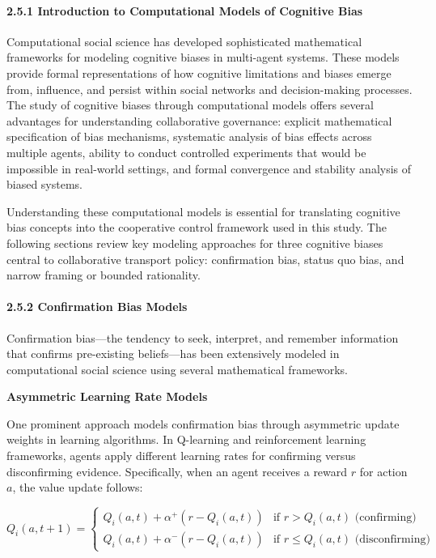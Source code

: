\paragraph{2.5.1 Introduction to Computational Models of Cognitive
Bias}\label{introduction-to-computational-models-of-cognitive-bias}

Computational social science has developed sophisticated mathematical
frameworks for modeling cognitive biases in multi-agent systems. These
models provide formal representations of how cognitive limitations and
biases emerge from, influence, and persist within social networks and
decision-making processes. The study of cognitive biases through
computational models offers several advantages for understanding
collaborative governance: explicit mathematical specification of bias
mechanisms, systematic analysis of bias effects across multiple agents,
ability to conduct controlled experiments that would be impossible in
real-world settings, and formal convergence and stability analysis of
biased systems.

Understanding these computational models is essential for translating
cognitive bias concepts into the cooperative control framework used in
this study. The following sections review key modeling approaches for
three cognitive biases central to collaborative transport policy:
confirmation bias, status quo bias, and narrow framing or bounded
rationality.

\paragraph{2.5.2 Confirmation Bias
Models}\label{confirmation-bias-models}

Confirmation bias---the tendency to seek, interpret, and remember
information that confirms pre-existing beliefs---has been extensively
modeled in computational social science using several mathematical
frameworks.

\textbf{Asymmetric Learning Rate Models}

One prominent approach models confirmation bias through asymmetric
update weights in learning algorithms. In Q-learning and reinforcement
learning frameworks, agents apply different learning rates for
confirming versus disconfirming evidence. Specifically, when an agent
receives a reward \(r\) for action \(a\), the value update follows:

\[Q_i(a,t+1) = \begin{cases}
Q_i(a,t) + \alpha^+(r - Q_i(a,t)) & \text{if } r > Q_i(a,t) \text{ (confirming)} \\
Q_i(a,t) + \alpha^-(r - Q_i(a,t)) & \text{if } r \leq Q_i(a,t) \text{ (disconfirming)}
\end{cases}\]

